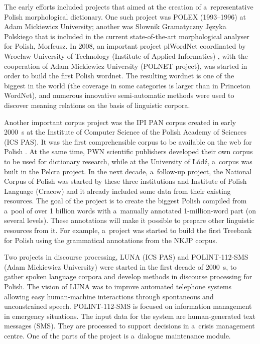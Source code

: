 \begin{multicols}{2}
The early efforts included projects that aimed at the creation of
a~representative Polish morphological dictionary. One such project was
POLEX (1993--1996) at Adam Mickiewicz University; another was Słownik
Gramatyczny Języka Polskiego \cite{SGJP} that is included in the
current state-of-the-art morphological analyser for Polish, Morfeusz.
In 2008, an important project plWordNet coordinated by Wrocław
University of Technology (Institute of Applied Informatics)
\cite{Piasecki2009, Slowosiec1}, with the cooperation of Adam
Mickiewicz University (POLNET project), was started in order to build
the first Polish wordnet. The resulting wordnet is one of the biggest
in the world (the coverage in some categories is larger than in
Princeton WordNet), and numerous innovative semi-automatic methods
were used to discover meaning relations on the basis of linguistic
corpora. 

Another important corpus project was the IPI PAN corpus created in
early 2000~s at the Institute of Computer Science of the Polish
Academy of Sciences (ICS PAS). It was the first comprehensible corpus
to be available on the web for Polish \cite{korpus1}. At the same
time, PWN scientific publishers developed their own corpus to be used
for dictionary research, while at the University of Łódź, a~corpus
was built in the Pelcra project. In the next decade, a~follow-up
project, the National Corpus of Polish \cite{nkjp1} was started by
these three institutions and Institute of Polish Language (Cracow) and
it already included some data from their existing resources. The goal
of the project is to create the biggest Polish compiled from a~pool of
over 1 billion words with a~manually annotated 1-million-word part (on
several levels). These annotations will make it possible to prepare
other linguistic resources from it. For example, a~project was started
to build the first Treebank for Polish using the grammatical
annotations from the NKJP corpus. 

Two projects in discourse processing, LUNA (ICS PAS) and
POLINT-112-SMS (Adam Mickiewicz University) were started in the first
decade of 2000~s, to gather spoken language corpora and develop
methods in discourse processing for Polish. The vision of LUNA was to
improve automated telephone systems allowing easy human-machine
interactions through spontaneous and unconstrained speech.
POLINT-112-SMS is focused on information management in emergency
situations. The input data for the system are human-generated text
messages (SMS). They are processed to support decisions in a~crisis
management centre. One of the parts of the project is a~dialogue
maintenance module. 


\end{multicols}

